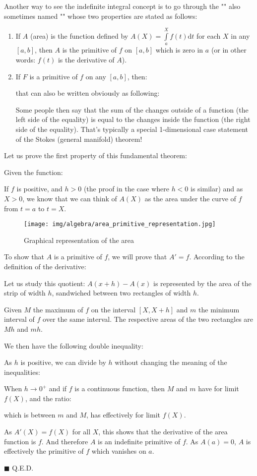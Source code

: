	
	Another way to see the indefinite integral concept is to go through the "" also sometimes named "\label{fundamental theorem of calculus}" whose two properties are stated as follows:
	\begin{enumerate}
		\item If $A$ (area) is the function defined by $A(X)=\displaystyle\int\limits_a^X f(t)\mathrm{d}t$ for each $X$ in any $[a, b]$, then $A$ is the primitive of $f$ on $[a, b]$ which is zero in $a$ (or in other words: $f (t)$ is the derivative of $A$).
		\item If $F$ is a primitive of $f$ on any $[a, b]$, then:
		
		that can also be written obviously as following:
		
		Some people then say that the sum of the changes outside of a function (the left side of the equality) is equal to the changes inside the function (the right side of the equality). That's typically a special 1-dimensional case statement of the Stokes (general manifold) theorem!
	\end{enumerate}
	Let us prove the first property of this fundamental theorem:
	\begin{dem}
	Given the function:
	
	If $f$ is positive, and $h>0$ (the proof in the case where $h<0$ is similar) and as $X>0$, we know that we can think of $A(X)$ as the area under the curve of $f$ from $t=a$ to $t=X$.
	\begin{figure}[H]
		\centering
		\texttt{[image: img/algebra/area\_primitive\_representation.jpg]}
		\caption{Graphical representation of the area}
	\end{figure}
	To show that $A$ is a primitive of $f$, we will prove that $A'=f$. According to the definition of the derivative:
	
	Let us study this quotient: $A(x+h)-A(x)$ is represented by the area of the strip of width $h$, sandwiched between two rectangles of width $h$.
	
		Given $M$ the maximum of $f$ on the interval $[X,X+h]$ and $m$ the minimum interval of $f$ over the same interval. The respective areas of the two rectangles are $Mh$ and $mh$.
	
	We then have the following double inequality:
	

	As $h$ is positive, we can divide by $h$ without changing the meaning of  the inequalities:
	
	When $h\rightarrow 0^+$ and if $f$ is a continuous function, then $M$ and $m$ have for limit $f (X)$, and the ratio:
	
	which is between $m$ and $M$, has effectively for limit $f(X)$.
	
	As $A'(X)=f(X)$ for all $X$, this shows that the derivative of the area function is $f$. And therefore $A$ is an indefinite primitive of $f$. As $A(a)=0$, $A$ is effectively the primitive of $f$ which vanishes on $a$.
	\begin{flushright}
		$\blacksquare$  Q.E.D.
	\end{flushright}
	\end{dem}
